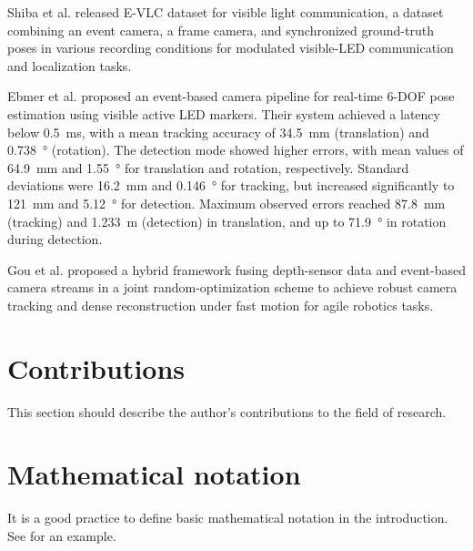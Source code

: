 Shiba et al. \cite{Shiba25cvprw} released E-VLC dataset for visible light communication, a dataset combining an event camera, a frame camera, and synchronized ground-truth poses in various recording conditions for modulated visible-\ac{LED} communication and localization tasks.

Ebmer et al. \cite{ebmer2023} proposed an event-based camera pipeline for real-time 6-\ac{DOF} pose estimation using visible active LED markers. Their system achieved a latency below \SI{0.5}{\milli\second}, with a mean tracking accuracy of \SI{34.5}{\milli\meter} (translation) and \SI{0.738}{\degree} (rotation). The detection mode showed higher errors, with mean values of \SI{64.9}{\milli\meter} and \SI{1.55}{\degree} for translation and rotation, respectively. Standard deviations were \SI{16.2}{\milli\meter} and \SI{0.146}{\degree} for tracking, but increased significantly to \SI{121}{\milli\meter} and \SI{5.12}{\degree} for detection. Maximum observed errors reached \SI{87.8}{\milli\meter} (tracking) and \SI{1.233}{\meter} (detection) in translation, and up to \SI{71.9}{\degree} in rotation during detection.

Gou et al. \cite{GOU2025328} proposed a hybrid framework fusing depth-sensor data and event-based camera streams in a joint random-optimization scheme to achieve robust camera tracking and dense reconstruction under fast motion for agile robotics tasks.

\section{Contributions}

This section should describe the author's contributions to the field of research.

\section{Mathematical notation}


It is a good practice to define basic mathematical notation in the introduction.
See  for an example.

